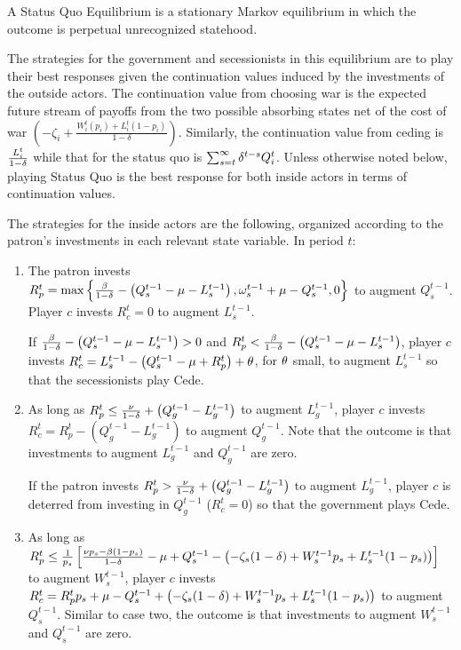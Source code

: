 \begin{definition}
A Status Quo Equilibrium is a stationary Markov equilibrium in which the outcome is perpetual unrecognized statehood.

The strategies for the government and secessionists in this equilibrium are to play their best responses given the continuation values induced by the investments of the outside actors. The continuation value from choosing war is the expected future stream of payoffs from the two possible absorbing states net of the cost of war $\left(-\zeta_i +\frac{W_i^t(p_i)+ L_i^t(1-p_i)}{1-\delta}\right)$. Similarly, the continuation value from ceding is $\frac{L_i^t}{1-\delta}$ while that for the status quo is $\sum_{s=t}^\infty \delta^{t-s} Q_i^t$. Unless otherwise noted below, playing Status Quo is the best response for both inside actors in terms of continuation values.

The strategies for the inside actors are the following, organized according to the patron's investments in each relevant state variable. In period $t$:

\begin{enumerate}
	\item The patron invests $R_p^t = \max\left\{\frac{\beta}{1-\delta} - \left( Q_s^{t-1} - \mu - L_s^{t-1}\right),\omega_s^{t-1} +\mu - Q_s^{t-1},0\right\}$ to augment $Q_s^{t-1}$. Player $c$ invests $R_c^t =0$ to augment $L_s^{t-1}$.

If $\frac{\beta}{1-\delta} - \left( Q_s^{t-1} - \mu - L_s^{t-1}\right) > 0$ and $R_p^t < \frac{\beta}{1-\delta} - \left( Q_s^{t-1} - \mu - L_s^{t-1}\right)$, player $c$ invests $R_c^t = L_s^{t-1} - \left(Q_s^{t-1} - \mu + R_p^t \right) + \theta$, for $\theta$ small, to augment $L_s^{t-1}$ so that the secessionists play Cede.

	\item As long as $R_p^t \leq \frac{\nu}{1-\delta} + \left( Q_g^{t-1} - L_g^{t-1}\right)$ to augment $L_g^{t-1}$, player $c$ invests $R_c^t = R_p^t - \left( Q_g^{t-1} - L_g^{t-1}\right)$ to augment $Q_g^{t-1}$. Note that the outcome is that investments to augment $L_g^{t-1}$ and $Q_g^{t-1}$ are zero.

If the patron invests $R_p^t > \frac{\nu}{1-\delta} + \left( Q_g^{t-1} - L_g^{t-1}\right)$ to augment $L_g^{t-1}$, player $c$ is deterred from investing in $Q_g^{t-1}$ ($R_c^t = 0$) so that the government plays Cede.

	\item As long as $R_p^t \leq \frac{1}{p_s} \left[\frac{\nu p_s - \beta (1-p_s)}{1 -\delta} - \mu + Q_s^{t-1} - \left(-\zeta_{s}(1-\delta) + W_s^{t-1}p_s + L_s^{t-1}(1-p_s)\right)\right]$ to augment $W_s^{t-1}$, player $c$ invests $R_c^t = R_p^tp_s + \mu - Q_s^{t-1} + \left(-\zeta_{s}(1-\delta) + W_s^{t-1}p_s + L_s^{t-1}(1-p_s)\right)$ to augment $Q_s^{t-1}$. Similar to case two, the outcome is that investments to augment $W_s^{t-1}$ and $Q_s^{t-1}$ are zero.


\end{enumerate}
\end{definition}
